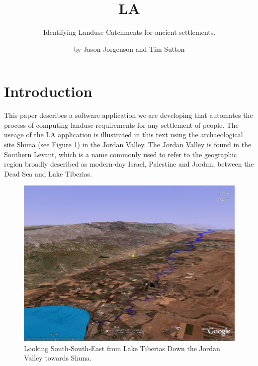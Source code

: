 

\title{LA} \subtitle{Identifying Landuse Catchments for 
ancient settlements.}

\author{by Jason Jorgenson and Tim Sutton}

\maketitle

\section{Introduction} \label{sec:Introduction}
  This paper describes a software application we are developing that automates
  the process of computing landuse requirements for any settlement of people.
  The useage of the LA application is illustrated in this text using the  
  archaeological site Shuna (see Figure \ref{fig:shunaGoogleEarth}) in the Jordan
  Valley.  The Jordan Valley is found in the Southern Levant, which is a name
  commonly used to refer to the geographic region broadly described as modern-day
  Israel, Palestine and Jordan, between the Dead Sea and Lake Tiberias.

  \begin{figure}[htbp] %
    \includegraphics[scale=0.17]{./images/ShunaGoogleEarth3D.jpg}
    \caption{\label{fig:shunaGoogleEarth}Looking South-South-East from Lake
      Tiberias Down the Jordan Valley towards Shuna.} 
  \end{figure}


